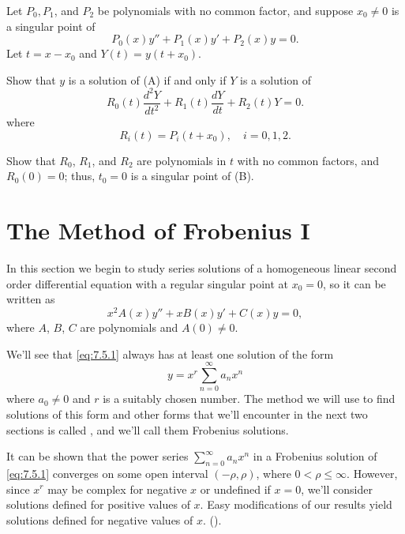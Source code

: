 \begin{exerciselist}
\item\label{exer:7.4.23}Let  $P_0,P_1$, and $P_2$ be polynomials  with no common factor,  and
suppose   $x_0\ne0$ is a singular point of
\[
P_0(x)y''+P_1(x)y'+P_2(x)y=0.
\tag{A}
\]
Let $t=x-x_0$ and $Y(t)=y(t+x_0)$.
\begin{alist}
\item %
Show that $y$ is a solution of (A) if and only if $Y$
is a solution of
\[
R_0(t)\frac{d^2Y}{dt^2}+R_1(t)\frac{dY}{dt}+R_2(t)Y=0.
\tag{B}
\]
where
\[
R_i(t)=P_i(t+x_0),\quad i=0,1,2.
\]
\item %
Show that $R_0$, $R_1$, and $R_2$ are polynomials in $t$ with no common
factors, and $R_0(0)=0$;   thus,  $t_0=0$ is a singular
point of (B).
\end{alist}

\end{exerciselist}

\section{The Method of Frobenius I}\label{sec:frobenius_i}

In this section we begin to study  series solutions of a
homogeneous linear second order differential equation with a regular
singular point at $x_0=0$,
so it can be written as
\begin{equation} \label{eq:7.5.1}
x^2A(x)y''+xB(x)y'+C(x)y=0,
\end{equation}
where $A$, $B$, $C$ are polynomials and $A(0)\ne0$.

We'll see that \eqref{eq:7.5.1} always has at least one solution of
the form
\[
y=x^r\sum_{n=0}^\infty a_nx^n
\]
where $a_0\ne0$ and $r$ is a suitably chosen number.
The method  we
will use to find solutions of this form and other forms that we'll
encounter in the next two sections is called
,
and we'll call them Frobenius solutions.

It can be shown that the power series
$\sum_{n=0}^\infty a_nx^n$ in a
Frobenius solution of \eqref{eq:7.5.1} converges on some open interval
$(-\rho,\rho)$, where $0<\rho\le\infty$. However, since $x^r$ may be
complex for negative $x$ or undefined if $x=0$, we'll consider
solutions defined for positive values of $x$. Easy modifications of
our results yield solutions defined for negative values of $x$.
().

